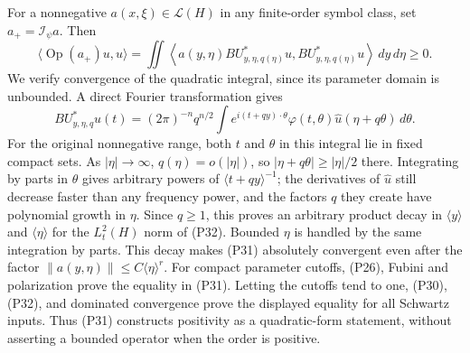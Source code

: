 \documentclass[
  11pt,
]{article}
\begin{document}
For a nonnegative \(a(x,\xi)\in\mathcal L(H)\) in any finite-order
symbol class, set \(a_+=\mathcal I_\psi a\). Then \[
 \langle\operatorname{Op}(a_+)u,u\rangle
 =\iint\left\langle a(y,\eta)B U_{y,\eta,q(\eta)}^*u,
                         B U_{y,\eta,q(\eta)}^*u\right\rangle
 \,dy\,d\eta\geq0.
\tag{P31}
\] We verify convergence of the quadratic integral, since its parameter
domain is unbounded. A direct Fourier transformation gives \[
 B U_{y,\eta,q}^*u(t)
 =(2\pi)^{-n}q^{n/2}\int
 e^{i(t+qy)\cdot\theta}\varphi(t,\theta)
 \widehat u(\eta+q\theta)\,d\theta.
\tag{P32}
\] For the original nonnegative range, both \(t\) and \(\theta\) in this
integral lie in fixed compact sets. As \(|\eta|\to\infty\),
\(q(\eta)=o(|\eta|)\), so \(|\eta+q\theta|\geq|\eta|/2\) there.
Integrating by parts in \(\theta\) gives arbitrary powers of
\(\langle t+qy\rangle^{-1}\); the derivatives of \(\widehat u\) still
decrease faster than any frequency power, and the factors \(q\) they
create have polynomial growth in \(\eta\). Since \(q\geq1\), this proves
an arbitrary product decay in \(\langle y\rangle\) and
\(\langle\eta\rangle\) for the \(L^2_t(H)\) norm of (P32). Bounded
\(\eta\) is handled by the same integration by parts. This decay makes
(P31) absolutely convergent even after the factor
\(\|a(y,\eta)\|\leq C\langle\eta\rangle^r\). For compact parameter
cutoffs, (P26), Fubini and polarization prove the equality in (P31).
Letting the cutoffs tend to one, (P30), (P32), and dominated convergence
prove the displayed equality for all Schwartz inputs. Thus (P31)
constructs positivity as a quadratic-form statement, without asserting a
bounded operator when the order is positive.
\end{document}
